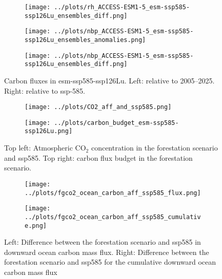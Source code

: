 \documentclass[]{article}
\begin{document}
\begin{figure}[H]
\begin{subfigure}[b]{0.4\linewidth}
    \end{subfigure}
    \begin{subfigure}[b]{0.4\linewidth}
        \texttt{[image: ../plots/rh\_ACCESS-ESM1-5\_esm-ssp585-ssp126Lu\_ensembles\_diff.png]}
    \end{subfigure}
    \begin{subfigure}[b]{0.4\linewidth}
        \texttt{[image: ../plots/nbp\_ACCESS-ESM1-5\_esm-ssp585-ssp126Lu\_ensembles\_anomalies.png]}
    \end{subfigure}
    \begin{subfigure}[b]{0.4\linewidth}
        \texttt{[image: ../plots/nbp\_ACCESS-ESM1-5\_esm-ssp585-ssp126Lu\_ensembles\_diff.png]}
    \end{subfigure}
    \caption{Carbon fluxes in esm-ssp585-ssp126Lu.  Left: relative to 2005–2025. Right: relative to ssp-585.}
    \label{fig:cflux}
\end{figure}

\begin{figure}
    \centering
    \begin{subfigure}[b]{0.4\linewidth}
        \texttt{[image: ../plots/CO2\_aff\_and\_ssp585.png]}
    \end{subfigure}
    \begin{subfigure}[b]{0.4\linewidth}
        \texttt{[image: ../plots/carbon\_budget\_esm-ssp585-ssp126Lu.png]}
    \end{subfigure}
    \caption{Top left: Atmospheric CO$_2$ concentration in the forestation scenario and ssp585. Top right: carbon flux budget in the forestation scenario.}
    \label{fig:atmosphere_carbon}
\end{figure}

\begin{figure}
    \centering
    \begin{subfigure}[b]{0.4\linewidth}
        \texttt{[image: ../plots/fgco2\_ocean\_carbon\_aff\_ssp585\_flux.png]}
    \end{subfigure}
    \begin{subfigure}[b]{0.4\linewidth}
        \texttt{[image: ../plots/fgco2\_ocean\_carbon\_aff\_ssp585\_cumulative.png]}
    \end{subfigure}
    \caption{Left: Difference between the forestation scenario and ssp585 in downward ocean carbon mass flux. Right: Difference between the forestation scenario and ssp585 for the cumulative downward ocean carbon mass flux}
    \label{fig:ocean_carbon}
\end{figure}
\end{document}
